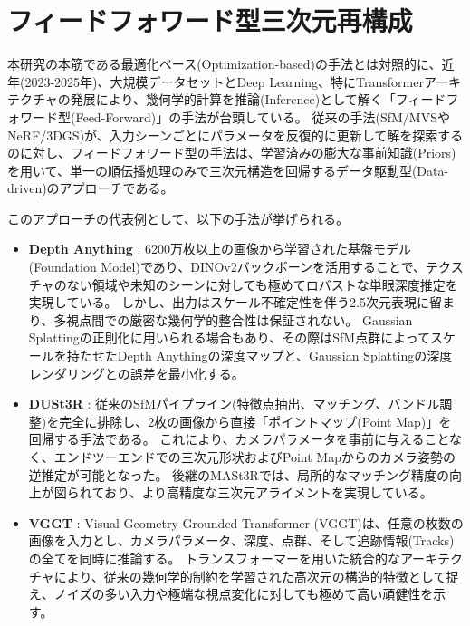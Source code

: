 \newpage
\section{フィードフォワード型三次元再構成}\label{sec:feedforward-3d-reconstruction}

本研究の本筋である最適化ベース(Optimization-based)の手法とは対照的に、近年(2023-2025年)、大規模データセットとDeep Learning、特にTransformerアーキテクチャの発展により、幾何学的計算を推論(Inference)として解く「フィードフォワード型(Feed-Forward)」の手法が台頭している。
従来の手法(SfM/MVSやNeRF/3DGS)が、入力シーンごとにパラメータを反復的に更新して解を探索するのに対し、フィードフォワード型の手法は、学習済みの膨大な事前知識(Priors)を用いて、単一の順伝播処理のみで三次元構造を回帰するデータ駆動型(Data-driven)のアプローチである。

このアプローチの代表例として、以下の手法が挙げられる。

\begin{itemize} 
  \item \textbf{Depth Anything} \cite{Yang2024CVPR_DepthAnything,Yang2024arXiv_DepthAnythingV2}: 
  6200万枚以上の画像から学習された基盤モデル(Foundation Model)であり、DINOv2バックボーンを活用することで、テクスチャのない領域や未知のシーンに対しても極めてロバストな単眼深度推定を実現している。
  しかし、出力はスケール不確定性を伴う2.5次元表現に留まり、多視点間での厳密な幾何学的整合性は保証されない。
  Gaussian Splattingの正則化に用いられる場合もあり、その際はSfM点群によってスケールを持たせたDepth Anythingの深度マップと、Gaussian Splattingの深度レンダリングとの誤差を最小化する。

  \item \textbf{DUSt3R} \cite{Wang2024CVPR_DUSt3R, Leroy2024ECCV_MASt3R}: 
  従来のSfMパイプライン(特徴点抽出、マッチング、バンドル調整)を完全に排除し、2枚の画像から直接「ポイントマップ(Point Map)」を回帰する手法である。 
  これにより、カメラパラメータを事前に与えることなく、エンドツーエンドでの三次元形状およびPoint Mapからのカメラ姿勢の逆推定が可能となった。
  後継のMASt3Rでは、局所的なマッチング精度の向上が図られており、より高精度な三次元アライメントを実現している。

  \item \textbf{VGGT} \cite{Wang2025CVPR_VGGT}: 
  Visual Geometry Grounded Transformer (VGGT)は、任意の枚数の画像を入力とし、カメラパラメータ、深度、点群、そして追跡情報(Tracks)の全てを同時に推論する。
  トランスフォーマーを用いた統合的なアーキテクチャにより、従来の幾何学的制約を学習された高次元の構造的特徴として捉え、ノイズの多い入力や極端な視点変化に対しても極めて高い頑健性を示す。

\end{itemize}

